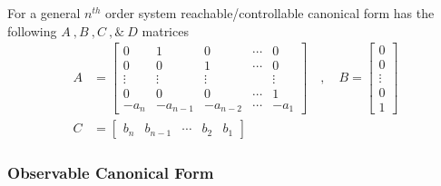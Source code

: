 \documentclass[twoside]{article}
\begin{document}
For a general $n^{th}$ order system reachable/controllable
canonical form has the following $A \ ,  B \ ,  C \ , \& \ D$
matrices
%
\begin{align*}
A &= \left[ \begin{array}{ccccc} 0 & 1 & 0 & \cdots & 0 \\ 0 & 0 & 1 &
                                                                      \cdots & 0
\\ \vdots & \vdots & \vdots & & \vdots
\\ 0 & 0 & 0 & \cdots & 1
    \\ -a_n & -a_{n-1} & -a_{n-2} & \cdots & -a_1 \end{array} \right]
\quad , \quad 
B = \left[ \begin{array}{c} 0\\ 0 \\ \vdots \\ 0
    \\ 1 \end{array} \right]
\\ C &= \left[ \begin{array}{ccccc} b_n 
  &  b_{n-1} & \cdots &  b_2 &
   b_1 \end{array} \right]
\end{align*}

\subsubsection*{Observable Canonical Form}
\end{document}
